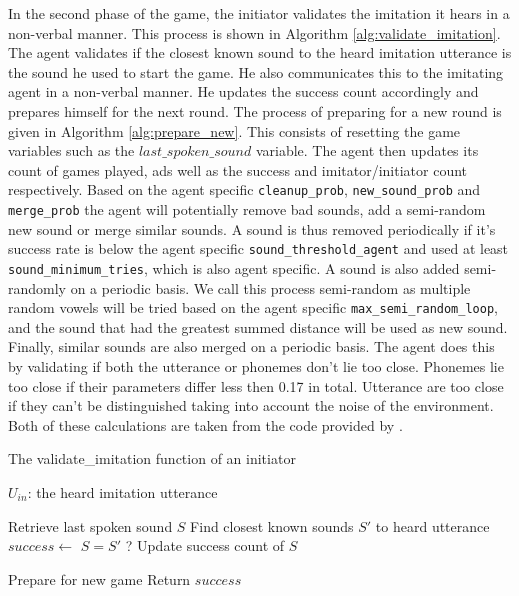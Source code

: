 
In the second phase of the game, the initiator validates the imitation it hears in a non-verbal manner.
This process is shown in Algorithm \ref{alg:validate_imitation}.
The agent validates if the closest known sound to the heard imitation utterance is the sound he used to start the game.
He also communicates this to the imitating agent in a non-verbal manner.
He updates the success count accordingly and prepares himself for the next round.
The process of preparing for a new round is given in Algorithm \ref{alg:prepare_new}.
This consists of resetting the game variables such as the $last\_spoken\_sound$ variable.
The agent then updates its count of games played, ads well as the success and imitator/initiator count respectively.
Based on the agent specific \texttt{cleanup\_prob}, \texttt{new\_sound\_prob} and \texttt{merge\_prob} the agent will potentially remove bad sounds, add a semi-random new sound or merge similar sounds.
A sound is thus removed periodically if it's success rate is below the agent specific \texttt{sound\_threshold\_agent} and used at least \texttt{sound\_minimum\_tries}, which is also agent specific.
A sound is also added semi-randomly on a periodic basis.
We call this process semi-random as multiple random vowels will be tried based on the agent specific \texttt{max\_semi\_random\_loop}, and the sound that had the greatest summed distance will be used as new sound.
Finally, similar sounds are also merged on a periodic basis.
The agent does this by validating if both the utterance or phonemes don't lie too close.
Phonemes lie too close if their parameters differ less then 0.17 in total.
Utterance are too close if they can't be distinguished taking into account the noise of the environment.
Both of these calculations are taken from the code provided by \citet{deBoer2000}.



\begin{algorithm}[hbt!]
\caption{The validate\_imitation function of an initiator}\label{alg:validate_imitation}
\begin{algorithmic}
\Require $U_{in}$: the heard imitation utterance

\State Retrieve last spoken sound $S$
\State Find closest known sounds $S'$ to heard utterance
\State $success \gets$ $S = S'$ ?
    \State Update success count of $S$
\EndIf

\State Prepare for new game
\State Return $success$
\end{algorithmic}
\end{algorithm}

